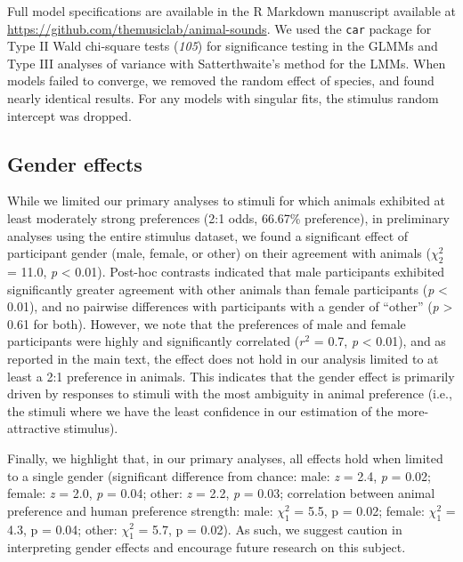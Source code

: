 \documentclass[
]{article}
\begin{document}
Full model specifications are available in the R Markdown manuscript
available at \url{https://github.com/themusiclab/animal-sounds}. We used
the \texttt{car} package for Type II Wald chi-square tests (\emph{105})
for significance testing in the GLMMs and Type III analyses of variance
with Satterthwaite's method for the LMMs. When models failed to
converge, we removed the random effect of species, and found nearly
identical results. For any models with singular fits, the stimulus
random intercept was dropped.

\subsection{Gender effects}\label{gender-effects}

While we limited our primary analyses to stimuli for which animals
exhibited at least moderately strong preferences (2:1 odds, 66.67\%
preference), in preliminary analyses using the entire stimulus dataset,
we found a significant effect of participant gender (male, female, or
other) on their agreement with animals (\(\chi^{2}_{2}\) = 11.0,
\emph{p} \textless{} 0.01). Post-hoc contrasts indicated that male
participants exhibited significantly greater agreement with other
animals than female participants (\emph{p} \textless{} 0.01), and no
pairwise differences with participants with a gender of ``other''
(\emph{p} \textgreater{} 0.61 for both). However, we note that the
preferences of male and female participants were highly and
significantly correlated (\(r^{2}\) = 0.7, \emph{p} \textless{} 0.01),
and as reported in the main text, the effect does not hold in our
analysis limited to at least a 2:1 preference in animals. This indicates
that the gender effect is primarily driven by responses to stimuli with
the most ambiguity in animal preference (i.e., the stimuli where we have
the least confidence in our estimation of the more-attractive stimulus).

Finally, we highlight that, in our primary analyses, all effects hold
when limited to a single gender (significant difference from chance:
male: \emph{z} = 2.4, \emph{p} = 0.02; female: \emph{z} = 2.0, \emph{p}
= 0.04; other: \emph{z} = 2.2, \emph{p} = 0.03; correlation between
animal preference and human preference strength: male: \(\chi^{2}_{1}\)
= 5.5, p = 0.02; female: \(\chi^{2}_{1}\) = 4.3, p = 0.04; other:
\(\chi^{2}_{1}\) = 5.7, p = 0.02). As such, we suggest caution in
interpreting gender effects and encourage future research on this
subject.
\end{document}
